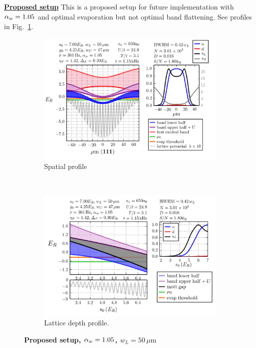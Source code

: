 \vspace{-2em}
\begin{myblock} 
  \underline{ \textbf{Proposed setup}} \newline  This is a proposed setup for
future implementation with $ \alpha_{w} =1.05$ and optimal evaporation but not
optimal band flattening. See profiles in Fig.~\ref{fig:compare04}.
\end{myblock} 
\begin{figure}
        \centering
        \begin{subfigure}[t]{0.49\textwidth}
		\includegraphics[width=\textwidth]{../figures/lda_evap/figures_hubbard-lda/Flat/010.png}
\caption{Spatial profile }
        \end{subfigure}%
        ~~ %
        \begin{subfigure}[t]{0.49\textwidth}
		\includegraphics[width=\textwidth]{../figures/lda_evap/figures_hubbard-lda/Flat/Mathy/010.png}
\caption{Lattice depth profile.}
        \end{subfigure}
	\caption{ 
\textbf{Proposed setup, $ \alpha_{w} =1.05$, $w_{L}=50\,\mu\mathrm{m}$} 
 }
\label{fig:compare04}
\end{figure}

